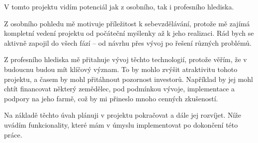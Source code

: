 V tomto projektu vidím potenciál jak z osobního, tak i profesního hlediska.

Z osobního pohledu mě motivuje příležitost k sebevzdělávání, protože mě zajímá kompletní vedení projektu od počáteční myšlenky až k jeho realizaci.
Rád bych se aktivně zapojil do všech fází – od návrhu přes vývoj po řešení různých problémů.

Z profesního hlediska mě přitahuje vývoj těchto technologií, protože věřím, že v budoucnu budou mít klíčový význam.
To by mohlo zvýšit atraktivitu tohoto projektu, a časem by mohl přitáhnout pozornost investorů.
Například by jej mohl chtít financovat některý zemědělec, pod  podmínkou vývoje, implementace a podpory na jeho farmě, což by mi přineslo mnoho cenných zkušeností.

Na základě těchto úvah plánuji v projektu pokračovat a dále jej rozvíjet.
Níže uvádím funkcionality, které mám v úmyslu implementovat po dokončení této práce.\newline



